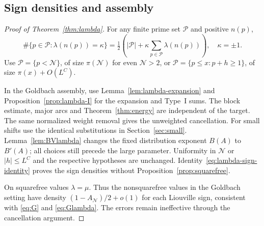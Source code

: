 \documentclass[11pt]{article}
\theoremstyle{definition}
\newcommand{\GN}{\mathcal N}
\theoremstyle{remark}
\numberwithin{equation}{section}
\begin{document}
\subsection{Sign densities and assembly}\label{subsec:lambda-assembly}
\begin{proof}[Proof of Theorem~\ref{thm:lambda}]
For any finite prime set $\mathcal P$ and positive $n(p)$,
\begin{equation}\label{eq:lambda-sign-identity}
 \#\{p\in\mathcal P:\lambda(n(p))=\kappa\}
 =\tfrac12\left(|\mathcal P|+
          \kappa\sum_{p\in\mathcal P}\lambda(n(p))\right),\quad\kappa=\pm1.
\end{equation}
Use $\mathcal P=\{p<\GN\}$, of size $\pi(\GN)$ for even
$\GN>2$, or $\mathcal P=\{p\le x:p+h\ge1\}$, of size
$\pi(x)+O(L^C)$.

In the Goldbach assembly, use Lemma~\ref{lem:lambda-expansion} and
Proposition~\ref{prop:lambda-I} for the expansion and Type~I sums.
The block estimate, major arcs and Theorem~\ref{thm:energy} are independent
of the target. The same normalized weight removal gives the unweighted
cancellation. For small shifts use the identical substitutions in
Section~\ref{sec:small}.
Lemma~\ref{lem:BVlambda} changes the fixed distribution exponent
$B(A)$ to $B'(A)$; all choices still precede the large parameter.
Uniformity in $\GN$ or $|h|\le L^C$ and the respective hypotheses
are unchanged. Identity~\eqref{eq:lambda-sign-identity} proves the
sign densities without Proposition~\ref{prop:squarefree}.

On squarefree values $\lambda=\mu$.
Thus the nonsquarefree values in the Goldbach setting have density
$(1-A_{\GN})/2+o(1)$ for each Liouville sign, consistent with
\eqref{eq:G} and \eqref{eq:Glambda}.
The errors remain ineffective through the cancellation argument.
\end{proof}
\end{document}
